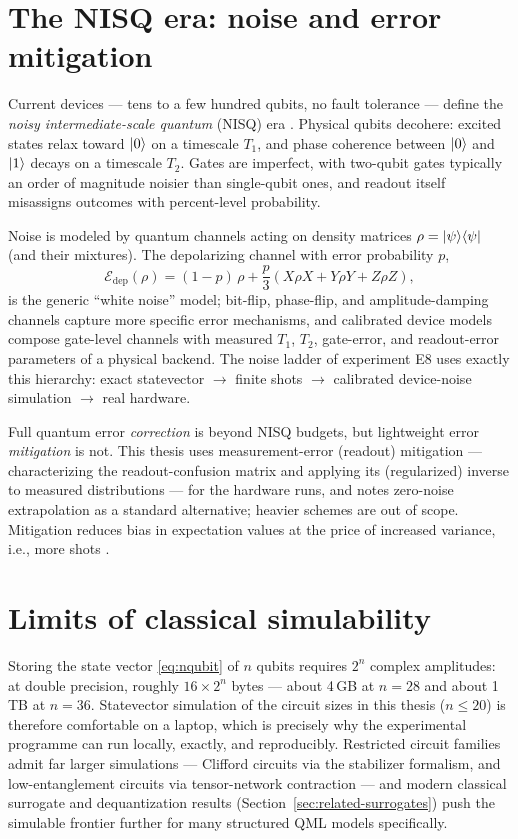 \section{The NISQ era: noise and error mitigation}
\label{sec:qc-nisq}

Current devices --- tens to a few hundred qubits, no fault tolerance ---
define the \emph{noisy intermediate-scale quantum} (NISQ) era
\citep{preskill2018nisq}. Physical qubits decohere: excited states relax
toward $\left|0\right\rangle$ on a timescale $T_1$, and phase coherence between $\left|0\right\rangle$
and $\left|1\right\rangle$ decays on a timescale $T_2$. Gates are imperfect, with two-qubit
gates typically an order of magnitude noisier than single-qubit ones, and
readout itself misassigns outcomes with percent-level probability.

Noise is modeled by quantum channels acting on density matrices
$\rho = \left|\psi\middle\rangle\middle\langle\psi\right|$ (and their mixtures). The depolarizing channel
with error probability $p$,
\begin{equation}
  \mathcal{E}_{\mathrm{dep}}(\rho)
    = (1 - p)\,\rho + \frac{p}{3}\left( X\rho X + Y\rho Y + Z\rho Z \right),
\end{equation}
is the generic ``white noise'' model; bit-flip, phase-flip, and
amplitude-damping channels capture more specific error mechanisms, and
calibrated device models compose gate-level channels with measured $T_1$,
$T_2$, gate-error, and readout-error parameters of a physical backend. The
noise ladder of experiment E8 uses exactly this hierarchy: exact statevector
$\rightarrow$ finite shots $\rightarrow$ calibrated device-noise simulation
$\rightarrow$ real hardware.

Full quantum error \emph{correction} is beyond NISQ budgets, but lightweight
error \emph{mitigation} is not. This thesis uses measurement-error (readout)
mitigation --- characterizing the readout-confusion matrix and applying its
(regularized) inverse to measured distributions --- for the hardware runs, and
notes zero-noise extrapolation as a standard alternative; heavier schemes are
out of scope. Mitigation reduces bias in expectation values at the price of
increased variance, i.e., more shots \citep{preskill2018nisq}.

\section{Limits of classical simulability}
\label{sec:qc-simulability}

Storing the state vector \eqref{eq:nqubit} of $n$ qubits requires $2^n$
complex amplitudes: at double precision, roughly $16 \times 2^n$ bytes ---
about 4\,GB at $n = 28$ and about 1\,TB at $n = 36$. Statevector simulation of
the circuit sizes in this thesis ($n \le 20$) is therefore comfortable on a
laptop, which is precisely why the experimental programme can run locally,
exactly, and reproducibly. Restricted circuit families admit far larger
simulations --- Clifford circuits via the stabilizer formalism, and
low-entanglement circuits via tensor-network contraction
\citep{nielsen2010quantum} --- and modern classical surrogate and
dequantization results (Section~\ref{sec:related-surrogates}) push the
simulable frontier further for many structured QML models specifically.

